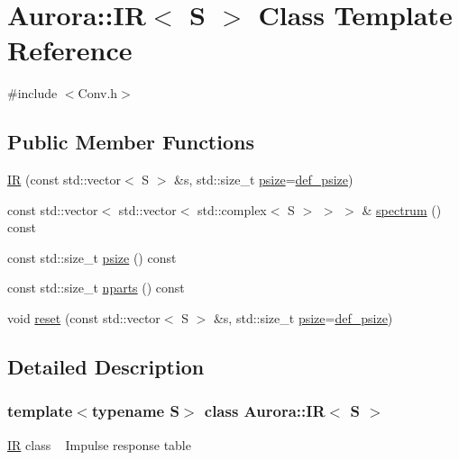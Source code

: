 \hypertarget{class_aurora_1_1_i_r}{}\section{Aurora\+:\+:IR$<$ S $>$ Class Template Reference}
\label{class_aurora_1_1_i_r}


{\ttfamily \#include $<$Conv.\+h$>$}

\subsection*{Public Member Functions}
\begin{DoxyCompactItemize}
\item 
\hyperlink{class_aurora_1_1_i_r_a2efce1ea1cacb440e68195209fb2e5e2}{IR} (const std\+::vector$<$ S $>$ \&s, std\+::size\+\_\+t \hyperlink{class_aurora_1_1_i_r_a6243d747aeccbe57b2e18cb34a806d70}{psize}=\hyperlink{namespace_aurora_a080d03c33477d9c6322278722ca8e472}{def\+\_\+psize})
\item 
const std\+::vector$<$ std\+::vector$<$ std\+::complex$<$ S $>$ $>$ $>$ \& \hyperlink{class_aurora_1_1_i_r_a2463850b1167583c7338025b204ed631}{spectrum} () const
\item 
const std\+::size\+\_\+t \hyperlink{class_aurora_1_1_i_r_a6243d747aeccbe57b2e18cb34a806d70}{psize} () const
\item 
const std\+::size\+\_\+t \hyperlink{class_aurora_1_1_i_r_a77d0fec4d82334a2f5533b4c8044c4e1}{nparts} () const
\item 
void \hyperlink{class_aurora_1_1_i_r_a78acfa992e609aee2661a2c72c7bbd8f}{reset} (const std\+::vector$<$ S $>$ \&s, std\+::size\+\_\+t \hyperlink{class_aurora_1_1_i_r_a6243d747aeccbe57b2e18cb34a806d70}{psize}=\hyperlink{namespace_aurora_a080d03c33477d9c6322278722ca8e472}{def\+\_\+psize})
\end{DoxyCompactItemize}


\subsection{Detailed Description}
\subsubsection*{template$<$typename S$>$\newline
class Aurora\+::\+I\+R$<$ S $>$}

\hyperlink{class_aurora_1_1_i_r}{IR} class ~\newline
Impulse response table 

